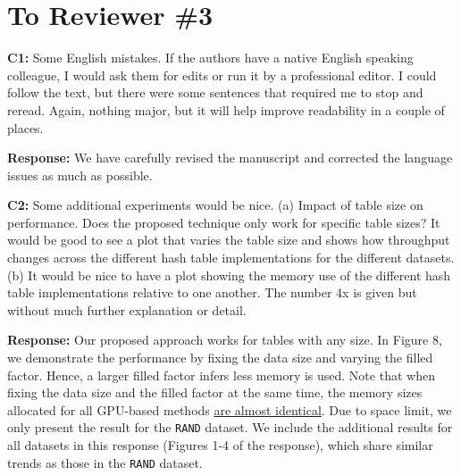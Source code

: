 \section*{To Reviewer \#3}

\begin{shaded}
	\noindent\textbf{C1:} Some English mistakes.  If the authors have a native English speaking colleague, I would ask them for edits or run it by a professional editor.  I could follow the text, but there were some sentences that required me to stop and reread.  Again, nothing major, but it will help improve readability in a couple of places.
\end{shaded}
%
\noindent\textbf{Response:} 
We have carefully revised the manuscript and corrected the language issues as much as possible. 

\begin{shaded}
	\noindent\textbf{C2:} Some additional experiments would be nice.
	(a) Impact of table size on performance.  Does the proposed technique only work for specific table sizes?  It would be good to see a plot that varies the table size and shows how throughput changes across the different hash table implementations for the different datasets.
	(b) It would be nice to have a plot showing the memory use of the different hash table implementations relative to one another.  The number 4x is given but without much further explanation or detail.
\end{shaded}
%
\noindent\textbf{Response:} 
Our proposed approach works for tables with any size. 
In Figure 8, we demonstrate the performance by fixing the data size and varying the filled factor. 
Hence, a larger filled factor infers less memory is used.
Note that when fixing the data size and the filled factor at the same time, the memory sizes allocated for all GPU-based methods \underline{are almost identical}.  
Due to space limit, we only present the result for the {\tt RAND} dataset.
We include the additional results for all datasets in this response (Figures 1-4 of the response), which share similar trends as those in the {\tt RAND} dataset.

